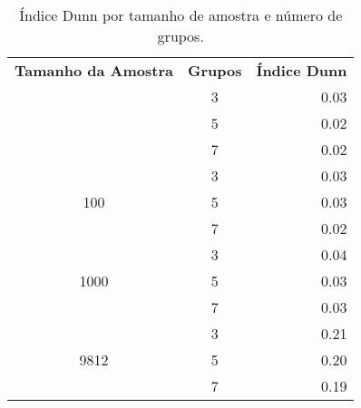 \begin{table}[htbp]
\centering
\begin{tabular}{|c|c|r|}
  \hline
	\textbf{Tamanho da Amostra} & \textbf{Grupos} & \textbf{Índice Dunn} \\
	\hhline{|=|=|=|}
	\multirow{3}{*}{10}   & 3 & 0.03 \\ \cline{2-3}
										    & 5 & 0.02 \\ \cline{2-3}
											  & 7 & 0.02 \\ \hline
  \multirow{3}{*}{100}  & 3 & 0.03 \\ \cline{2-3}
											  & 5 & 0.03 \\ \cline{2-3}
											  & 7 & 0.02 \\ \hline
  \multirow{3}{*}{1000} & 3 & 0.04 \\ \cline{2-3}
											  & 5 & 0.03 \\ \cline{2-3}
												& 7 & 0.03 \\ \hline
  \multirow{3}{*}{9812} & 3 & 0.21 \\ \cline{2-3}
												& 5 & 0.20 \\ \cline{2-3}
												& 7 & 0.19 \\ \hline
\end{tabular}
\caption{Índice Dunn por tamanho de amostra e número de grupos.} 
\label{tab:indice_dunn}
\end{table}
